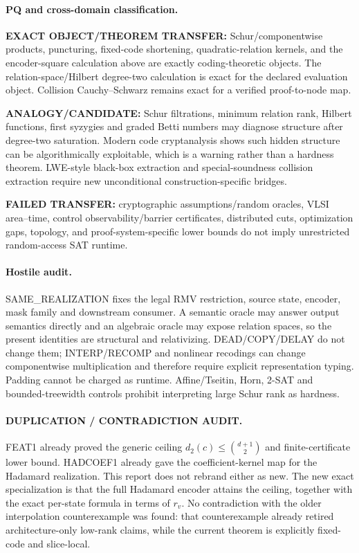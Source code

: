 \documentclass[11pt]{article}
\begin{document}
\paragraph{PQ and cross-domain classification.}
\textbf{EXACT OBJECT/THEOREM TRANSFER:} Schur/componentwise products, puncturing, fixed-code shortening, quadratic-relation kernels, and the encoder-square calculation above are exactly coding-theoretic objects. The relation-space/Hilbert degree-two calculation is exact for the declared evaluation object. Collision Cauchy--Schwarz remains exact for a verified proof-to-node map.

\textbf{ANALOGY/CANDIDATE:} Schur filtrations, minimum relation rank, Hilbert functions, first syzygies and graded Betti numbers may diagnose structure after degree-two saturation. Modern code cryptanalysis shows such hidden structure can be algorithmically exploitable, which is a warning rather than a hardness theorem. LWE-style black-box extraction and special-soundness collision extraction require new unconditional construction-specific bridges.

\textbf{FAILED TRANSFER:} cryptographic assumptions/random oracles, VLSI area--time, control observability/barrier certificates, distributed cuts, optimization gaps, topology, and proof-system-specific lower bounds do not imply unrestricted random-access SAT runtime.

\paragraph{Hostile audit.}
SAME\_REALIZATION fixes the legal RMV restriction, source state, encoder, mask family and downstream consumer. A semantic oracle may answer output semantics directly and an algebraic oracle may expose relation spaces, so the present identities are structural and relativizing. DEAD/COPY/DELAY do not change them; INTERP/RECOMP and nonlinear recodings can change componentwise multiplication and therefore require explicit representation typing. Padding cannot be charged as runtime. Affine/Tseitin, Horn, 2-SAT and bounded-treewidth controls prohibit interpreting large Schur rank as hardness.

\paragraph{DUPLICATION / CONTRADICTION AUDIT.}
FEAT1 already proved the generic ceiling \(d_2(c)\le\binom{d+1}{2}\) and finite-certificate lower bound. HADCOEF1 already gave the coefficient-kernel map for the Hadamard realization. This report does not rebrand either as new. The new exact specialization is that the full Hadamard encoder attains the ceiling, together with the exact per-state formula in terms of \(r_v\). No contradiction with the older interpolation counterexample was found: that counterexample already retired architecture-only low-rank claims, while the current theorem is explicitly fixed-code and slice-local.
\end{document}
